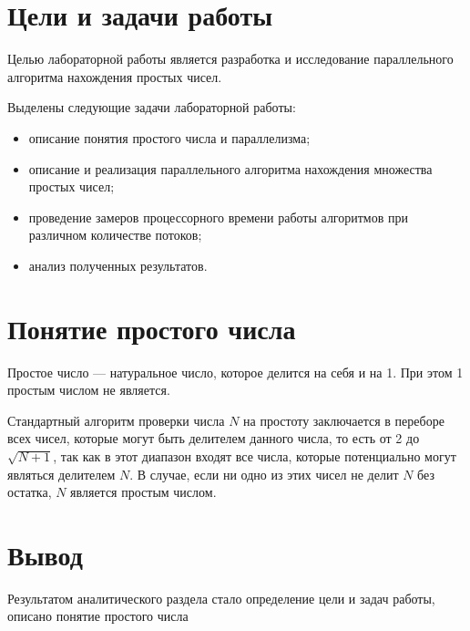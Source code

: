 \section{Цели и задачи работы}
Целью лабораторной работы является разработка и исследование параллельного алгоритма нахождения простых чисел.

Выделены следующие задачи лабораторной работы:

\begin{itemize}
\item описание понятия простого числа и параллелизма;
\item описание и реализация параллельного алгоритма нахождения множества простых чисел;
\item проведение замеров процессорного времени работы алгоритмов при различном количестве потоков;
\item анализ полученных результатов.
\end{itemize}

\section{Понятие простого числа}
Простое число --- натуральное число, которое делится на себя и на 1. При этом 1 простым числом не является\cite{prime_def}.

Стандартный алгоритм проверки числа $ N $ на простоту заключается в переборе всех чисел, которые могут быть делителем данного числа, то есть от 2 до $\sqrt{N+1}$, так как в этот диапазон входят все числа, которые потенциально могут являться делителем $N$. В случае, если ни одно из этих чисел не делит $N$ без остатка, $N$ является простым числом.

\section*{Вывод}
Результатом аналитического раздела стало определение цели и задач работы, описано понятие простого числа